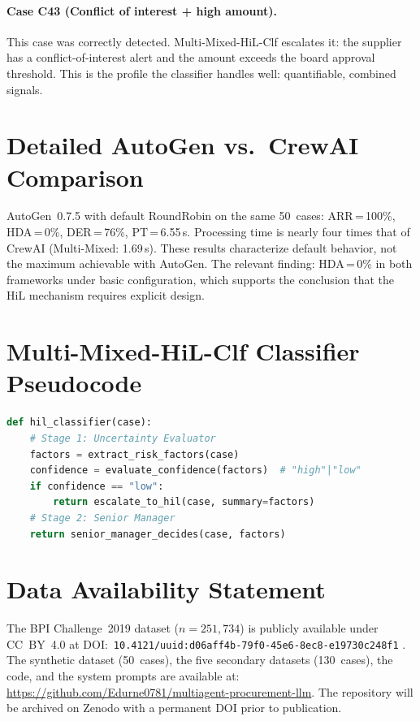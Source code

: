 \documentclass[preprint,12pt,numrefs]{elsarticle}
\begin{document}
\paragraph{Case C43 (Conflict of interest + high amount).}
This case was correctly detected. Multi-Mixed-HiL-Clf escalates it:
the supplier has a conflict-of-interest alert and the amount exceeds
the board approval threshold. This is the profile the classifier
handles well: quantifiable, combined signals.

\section{Detailed AutoGen vs.\ CrewAI Comparison}
\label{app:autogen}

AutoGen~0.7.5 with default RoundRobin on the same 50~cases:
ARR\,=\,100\%, HDA\,=\,0\%, DER\,=\,76\%, PT\,=\,6.55\,s. Processing
time is nearly four times that of CrewAI (Multi-Mixed: 1.69\,s). These
results characterize default behavior, not the maximum achievable with
AutoGen. The relevant finding: HDA\,=\,0\% in both frameworks under
basic configuration, which supports the conclusion that the HiL
mechanism requires explicit design.

\section{Multi-Mixed-HiL-Clf Classifier Pseudocode}
\label{app:pseudocodigo}

\begin{lstlisting}[language=Python]
def hil_classifier(case):
    # Stage 1: Uncertainty Evaluator
    factors = extract_risk_factors(case)
    confidence = evaluate_confidence(factors)  # "high"|"low"
    if confidence == "low":
        return escalate_to_hil(case, summary=factors)
    # Stage 2: Senior Manager
    return senior_manager_decides(case, factors)
\end{lstlisting}




\section*{Data Availability Statement}
The BPI Challenge~2019 dataset ($n=251{,}734$) is publicly available
under CC~BY~4.0 at
DOI:~\texttt{10.4121/uuid:d06aff4b-79f0-45e6-8ec8-e19730c248f1}
\citep{vandongen2019bpi}. The synthetic dataset (50~cases), the five
secondary datasets (130~cases), the code, and the system prompts are
available at:
\url{https://github.com/Edurne0781/multiagent-procurement-llm}.
The repository will be archived on Zenodo with a permanent DOI prior
to publication.
\end{document}
